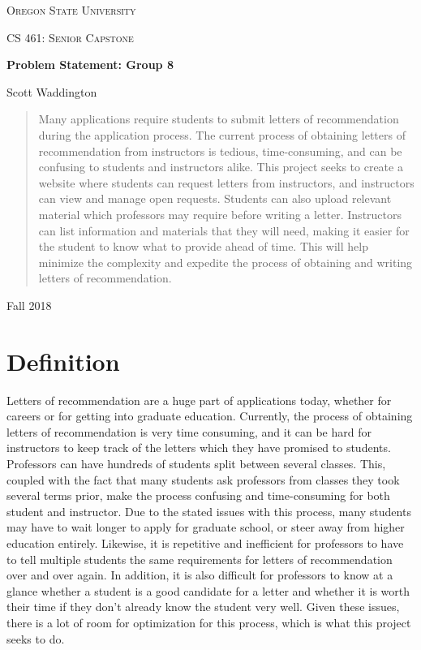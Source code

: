 \documentclass[letterpaper,10pt]{article}
\begin{document}
\begin{titlepage}
    \centering
    {\scshape\LARGE Oregon State University \par}
    \vspace{1cm}
    {\scshape\Large CS 461: Senior Capstone\par}
    \vspace{1.5cm}
    {\huge\bfseries Problem Statement: Group 8\par}
    \vspace{2cm}
    {\Large Scott Waddington\par}
    \vfill

    \begin{abstract}
        Many applications require students to submit letters of recommendation during the application process. The current process of obtaining letters of recommendation from instructors is tedious, time-consuming, and can be confusing to students and instructors alike. This project seeks to create a website where students can request letters from instructors, and instructors can view and manage open requests. Students can also upload relevant material which professors may require before writing a letter. Instructors can list information and materials that they will need, making it easier for the student to know what to provide ahead of time. This will help minimize the complexity and expedite the process of obtaining and writing letters of recommendation.
    \end{abstract}

    \vfill

    {\large Fall 2018\par}
\end{titlepage}

\clearpage
\tableofcontents
\newpage

\section{Definition}
Letters of recommendation are a huge part of applications today, whether for careers or for getting into graduate education. Currently, the process of obtaining letters of recommendation is very time consuming, and it can be hard for instructors to keep track of the letters which they have promised to students. Professors can have hundreds of students split between several classes. This, coupled with the fact that many students ask professors from classes they took several terms prior, make the process confusing and time-consuming for both student and instructor. Due to the stated issues with this process, many students may have to wait longer to apply for graduate school, or steer away from higher education entirely. Likewise, it is repetitive and inefficient for professors to have to tell multiple students the same requirements for letters of recommendation over and over again. In addition, it is also difficult for professors to know at a glance whether a student is a good candidate for a letter and whether it is worth their time if they don't already know the student very well. Given these issues, there is a lot of room for optimization for this process, which is what this project seeks to do.
\end{document}
